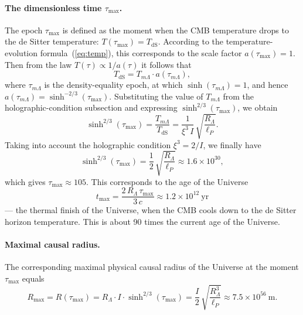 \documentclass[10pt,a4paper]{article}
\begin{document}
\paragraph{The dimensionless time $\tau_{\max}$.}
The epoch $\tau_{\max}$ is defined as the moment when the CMB temperature drops to the de Sitter temperature: $T(\tau_{\max}) = T_{\mathrm{dS}}$. According to the temperature-evolution formula~(\ref{eq:temp}), this corresponds to the scale factor $a(\tau_{\max}) = 1$. Then from the law $T(\tau) \propto 1/a(\tau)$ it follows that
\begin{equation}
T_{\mathrm{dS}} = T_{m\Lambda} \cdot a(\tau_{m\Lambda}),
\end{equation}
where $\tau_{m\Lambda}$ is the density-equality epoch, at which $\sinh(\tau_{m\Lambda}) = 1$, and hence $a(\tau_{m\Lambda}) = \sinh^{-2/3}(\tau_{\max})$. Substituting the value of $T_{m\Lambda}$ from the holographic-condition subsection and expressing $\sinh^{2/3}(\tau_{\max})$, we obtain
\begin{equation}
\sinh^{2/3}(\tau_{\max}) = \frac{T_{m\Lambda}}{T_{\mathrm{dS}}} = \frac{1}{\xi^3\,I}\,\sqrt{\frac{R_\Lambda}{\ell_P}}.
\end{equation}
Taking into account the holographic condition $\xi^3 = 2/I$, we finally have
\begin{equation}
\boxed{\sinh^{2/3}(\tau_{\max}) = \frac{1}{2}\,\sqrt{\frac{R_\Lambda}{\ell_P}} \approx 1.6 \times 10^{30},}
\end{equation}
which gives $\tau_{\max} \approx 105$. This corresponds to the age of the Universe
\begin{equation}
t_{\max} = \frac{2\,R_\Lambda\,\tau_{\max}}{3\,c} \approx 1.2 \times 10^{12}~\text{yr}
\end{equation}
--- the thermal finish of the Universe, when the CMB cools down to the de Sitter horizon temperature. This is about 90 times the current age of the Universe.

\paragraph{Maximal causal radius.}
The corresponding maximal physical causal radius of the Universe at the moment $\tau_{\max}$ equals
\begin{equation}
\boxed{R_{\max} = R(\tau_{\max}) = R_\Lambda \cdot I \cdot \sinh^{2/3}(\tau_{\max}) = \frac{I}{2}\,\sqrt{\frac{R_\Lambda^3}{\ell_P}} \approx 7.5 \times 10^{56}~\text{m}.}
\end{equation}
\end{document}
